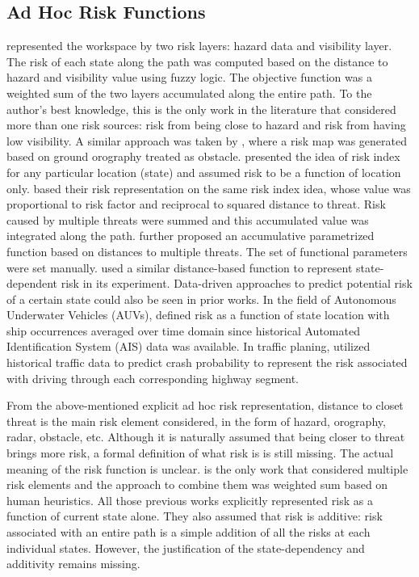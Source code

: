\documentclass[letterpaper]{article} %
\begin{document}
\subsection{Ad Hoc Risk Functions}
\citeauthor{soltani2004fuzzy} represented the workspace by two risk layers: hazard data and visibility layer. The risk of each state along the path was computed based on the distance to hazard and visibility value using fuzzy logic. The objective function was a weighted sum of the two layers accumulated along the entire path. To the author's best knowledge, this is the only work in the literature that considered more than one risk sources: risk from being close to hazard and risk from having low visibility. A similar approach was taken by \citeauthor{de2011minimum}, where a risk map was generated based on ground orography treated as obstacle. \citeauthor{vian1989trajectory} presented the idea of risk index for any particular location (state) and assumed risk to be a function of location only. \citeauthor{zabarankin2002optimal} based their risk representation on the same risk index idea, whose value was proportional to risk factor and reciprocal to squared distance to threat. Risk caused by multiple threats were summed and this accumulated value was integrated along the path. \citeauthor{gu2006comprehensive} further proposed an accumulative parametrized function based on distances to multiple threats. The set of functional parameters were set manually. \citeauthor{feyzabadi2014risk} used a similar distance-based function to represent state-dependent risk in its experiment. Data-driven approaches to predict potential risk of a certain state could also be seen in prior works. In the field of Autonomous Underwater Vehicles (AUVs), \citeauthor{pereira2011toward} defined risk as a function of state location with ship occurrences averaged over time domain since historical Automated Identification System (AIS) data was available. In traffic planing, \citeauthor{krumm2017risk} utilized historical traffic data to predict crash probability to represent the risk associated with driving through each corresponding highway segment.



From the above-mentioned explicit ad hoc risk representation, distance to closet threat is the main risk element considered, in the form of hazard, orography, radar, obstacle, etc. Although it is naturally assumed that being closer to threat brings more risk, a formal definition of what risk is is still missing. The actual meaning of the risk function is unclear. \cite{soltani2004fuzzy} is the only work that considered multiple risk elements and the approach to combine them was weighted sum based on human heuristics. All those previous works explicitly represented risk as a function of current state alone. They also assumed that risk is additive: risk associated with an entire path is a simple addition of all the risks at each individual states. However, the justification of the state-dependency and additivity remains missing.
\end{document}
